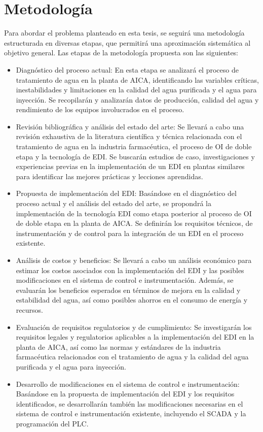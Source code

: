 \section*{Metodología}
Para abordar el problema planteado en esta tesis, se seguirá una metodología estructurada en diversas etapas, que permitirá una aproximación sistemática al objetivo general. Las etapas de la metodología propuesta son las siguientes:
\begin{itemize}
	\item Diagnóstico del proceso actual: En esta etapa se analizará el proceso de tratamiento de agua en la planta de AICA, identificando las variables críticas, inestabilidades y limitaciones en la calidad del agua purificada y el agua para inyección. Se recopilarán y analizarán datos de producción, calidad del agua y rendimiento de los equipos involucrados en el proceso.
	\item Revisión bibliográfica y análisis del estado del arte: Se llevará a cabo una revisión exhaustiva de la literatura científica y técnica relacionada con el tratamiento de agua en la industria farmacéutica, el proceso de OI de doble etapa y la tecnología de EDI. Se buscarán estudios de caso, investigaciones y experiencias previas en la implementación de un EDI en plantas similares para identificar las mejores prácticas y lecciones aprendidas.
	\item Propuesta de implementación del EDI: Basándose en el diagnóstico del proceso actual y el análisis del estado del arte, se propondrá la implementación de la tecnología EDI como etapa posterior al proceso de OI de doble etapa en la planta de AICA. Se definirán los requisitos técnicos, de instrumentación y de control para la integración de un EDI en el proceso existente.
	\item Análisis de costos y beneficios: Se llevará a cabo un análisis económico para estimar los costos asociados con la implementación del EDI y las posibles modificaciones en el sistema de control e instrumentación. Además, se evaluarán los beneficios esperados en términos de mejora en la calidad y estabilidad del agua, así como posibles ahorros en el consumo de energía y recursos.
	\item Evaluación de requisitos regulatorios y de cumplimiento: Se investigarán los requisitos legales y regulatorios aplicables a la implementación del EDI en la planta de AICA, así como las normas y estándares de la industria farmacéutica relacionados con el tratamiento de agua y la calidad del agua purificada y el agua para inyección.

	\item Desarrollo de modificaciones en el sistema de control e instrumentación: Basándose en la propuesta de
	      implementación del EDI y los requisitos identificados, se desarrollarán también las modificaciones necesarias en el
	      sistema de control e instrumentación existente, incluyendo el SCADA y la programación del PLC.
\end{itemize}






